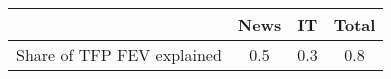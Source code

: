 \begin{small}
	\begin{tabular}{lccc}
	\hline
		& News & IT & Total \\
		\hline
		Share of TFP FEV explained & 0.5 & 0.3 & 0.8 \\
		\hline
	\end{tabular}
\end{small}
